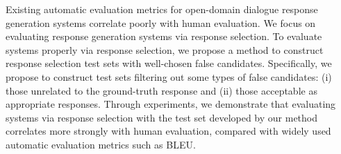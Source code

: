 Existing automatic evaluation metrics for open-domain dialogue response generation systems correlate poorly with human evaluation. We focus on evaluating response generation systems via response selection. To evaluate systems properly via response selection, we propose a method to construct response selection test sets with well-chosen false candidates. Specifically, we propose to construct test sets filtering out some types of false candidates: (i) those unrelated to the ground-truth response and (ii) those acceptable as appropriate responses. Through experiments, we demonstrate that evaluating systems via response selection with the test set developed by our method correlates more strongly with human evaluation, compared with widely used automatic evaluation metrics such as BLEU.
